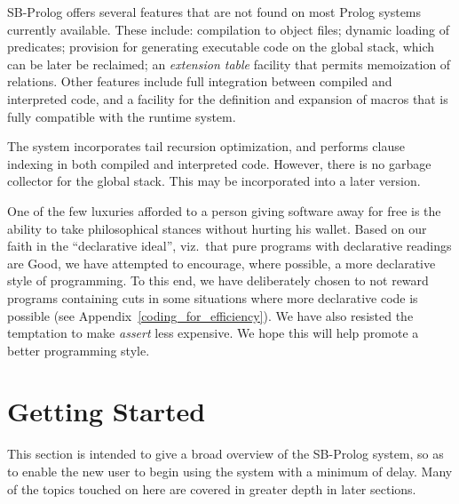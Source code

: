 SB-Prolog offers several features that are not found on most Prolog systems
currently available.
These include: compilation to object files;
dynamic loading of predicates;
provision for generating executable code on the global stack,
which can be later be reclaimed;
an {\em extension table} facility that permits memoization of relations.
Other features include full integration between compiled and interpreted code,
and a facility for the definition and expansion of macros
that is fully compatible with the runtime system.

The system incorporates tail recursion optimization,
and performs clause indexing in both compiled and interpreted code.
However, there is no garbage collector for the global stack.
This may be incorporated into a later version.

One of the few luxuries afforded to a person giving software away for free is
the ability to take philosophical stances without hurting his wallet.
Based on our faith in the ``declarative ideal'', viz.\ that pure
programs with declarative readings are Good, we have attempted to encourage,
where possible, a more declarative style of programming.
To this end, we have deliberately chosen to not reward programs containing cuts
in some situations where more declarative code is possible
(see Appendix~\ref{coding_for_efficiency}).
We have also resisted the temptation to make {\em assert} less expensive.
We hope this will help promote a better programming style.

\section{Getting Started}

This section is intended to give a broad overview of the SB-Prolog system,
so as to enable the new user to begin using the system with a minimum of delay.
Many of the topics touched on here are covered in greater depth
in later sections.

